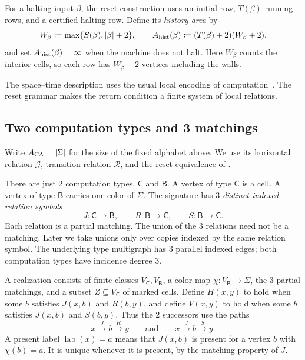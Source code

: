 \documentclass[10pt]{article}
\numberwithin{equation}{section}
\theoremstyle{definition}
\begin{document}
For a halting input $\beta$, the reset construction uses an initial row, $T(\beta)$ running rows, and a certified halting row. Define its \emph{history area} by
\begin{equation}\label{eq:historyarea}
 W_\beta\coloneqq\max\{S(\beta),|\beta|+2\},\qquad
 A_{\rm hist}(\beta)\coloneqq(T(\beta)+2)(W_\beta+2),
\end{equation}
and set $A_{\rm hist}(\beta)=\infty$ when the machine does not halt. Here $W_\beta$ counts the interior cells, so each row has $W_\beta+2$ vertices including the walls.

The space--time description uses the usual local encoding of computation~\cite{Wang1961,Berger1966,Robinson1971}. The reset grammar makes the return condition a finite system of local relations.

\subsection{Two computation types and 3 matchings}\label{sec:two-type-computation-module}

Write $A_{\rm CA}=|\Sigma|$ for the size of the fixed alphabet above. We use its horizontal relation $\mathcal G$, transition relation $\mathcal R$, and the reset equivalence of .

There are just 2 computation types, $\mathsf C$ and $\mathsf B$. A vertex of type $\mathsf C$ is a cell. A vertex of type $\mathsf B$ carries one color of $\Sigma$. The signature has 3
\emph{distinct indexed relation symbols}
\[
 J\colon\mathsf C\longrightarrow\mathsf B,
 \qquad R\colon\mathsf B\longrightarrow\mathsf C,
 \qquad S\colon\mathsf B\longrightarrow\mathsf C.
\]
Each relation is a partial matching. The union of the 3 relations need not be a matching. Later we take unions only over copies indexed by the same relation symbol. The underlying type multigraph has 3 parallel indexed edges; both computation types have incidence degree 3.

A realization consists of finite classes $V_{\mathsf C},V_{\mathsf B}$, a color map $\chi\colon V_{\mathsf B}\to\Sigma$, the 3 partial matchings, and a subset $Z\subseteq V_{\mathsf C}$ of marked cells. Define $H(x,y)$ to hold when some $b$ satisfies $J(x,b)$ and $R(b,y)$, and define $V(x,y)$ to hold when some $b$ satisfies $J(x,b)$ and $S(b,y)$. Thus the 2 successors use the paths
\[
 x\mathrel{\mathop{\longrightarrow}\limits^J}b\mathrel{\mathop{\longrightarrow}\limits^R}y\qquad\text{and}\qquad x\mathrel{\mathop{\longrightarrow}\limits^J}b\mathrel{\mathop{\longrightarrow}\limits^S}y.
\]
A present label $\operatorname{lab}(x)=a$ means that $J(x,b)$ is present for a vertex $b$ with $\chi(b)=a$. It is unique whenever it is present, by the matching property of $J$.
\end{document}
